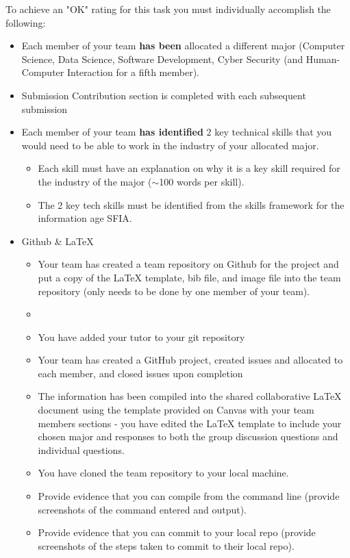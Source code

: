 \documentclass[a4paper, 11pt]{report}
\begin{document}
To achieve an "OK" rating for this task you must individually accomplish the following:
\begin{itemize}
\item Each member of your team \textbf{has been} allocated a different major (Computer Science, Data Science, Software Development, Cyber Security (and Human-Computer Interaction for a fifth member).
\item Submission Contribution section is completed with each subsequent submission
\item Each member of your team \textbf{has identified} 2 key technical skills that you would need to be able to work in the industry of your allocated major.
	\begin{itemize}
	\item Each skill must have an explanation on why it is a key skill required for the industry of the major ($\sim$100 words per skill).
	\item The 2 key tech skills must be identified from the skills framework for the information age SFIA.
	\end{itemize}
\item Github \& LaTeX
	\begin{itemize}
	\item Your team has created a team repository on Github for the project and put a copy of the LaTeX template, bib file, and image file into the team repository (only needs to be done by one member of your team).
    \item \item You have added your tutor to your git repository
    \item Your team has created a GitHub project, created issues and allocated to each member, and closed issues upon completion
	\item The information has been compiled into the shared collaborative LaTeX document using the template provided on Canvas with your team members sections - you have edited the LaTeX template to include your chosen major and responses to both the group discussion questions and individual questions.
	\item You have cloned the team repository to your local machine.
	\item Provide evidence that you can compile from the command line (provide screenshots of the command entered and output).
	\item Provide evidence that you can commit to your local repo (provide screenshots of the steps taken to commit to their local repo).

\end{itemize}
\end{itemize}
\end{document}
